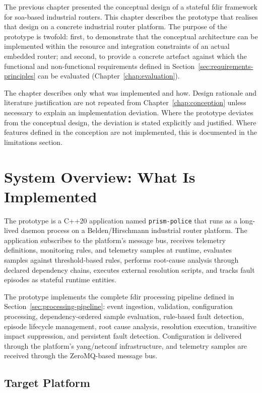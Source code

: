 The previous chapter presented the conceptual design of a stateful \gls{fdir} framework for \gls{soa}-based industrial routers. This chapter describes the prototype that realises that design on a concrete industrial router platform. The purpose of the prototype is twofold: first, to demonstrate that the conceptual architecture can be implemented within the resource and integration constraints of an actual embedded router; and second, to provide a concrete artefact against which the functional and non-functional requirements defined in Section~\ref{sec:requirements-principles} can be evaluated (Chapter~\ref{chap:evaluation}).

The chapter describes only what was implemented and how. Design rationale and literature justification are not repeated from Chapter~\ref{chap:conception} unless necessary to explain an implementation deviation. Where the prototype deviates from the conceptual design, the deviation is stated explicitly and justified. Where features defined in the conception are not implemented, this is documented in the limitations section.

\section{System Overview: What Is Implemented}\label{sec:impl-overview}

The prototype is a C++20 application named \texttt{prism-police} that runs as a long-lived daemon process on a Belden/Hirschmann industrial router platform. The application subscribes to the platform's message bus, receives telemetry definitions, monitoring rules, and telemetry samples at runtime, evaluates samples against threshold-based rules, performs root-cause analysis through declared dependency chains, executes external resolution scripts, and tracks fault episodes as stateful runtime entities.

The prototype implements the complete \gls{fdir} processing pipeline defined in Section~\ref{sec:processing-pipeline}: event ingestion, validation, configuration processing, dependency-ordered sample evaluation, rule-based fault detection, episode lifecycle management, root cause analysis, resolution execution, transitive impact suppression, and persistent fault detection. Configuration is delivered through the platform's \gls{yang}/\gls{netconf} infrastructure, and telemetry samples are received through the ZeroMQ-based message bus.

\subsection{Target Platform}\label{sec:target-platform}


